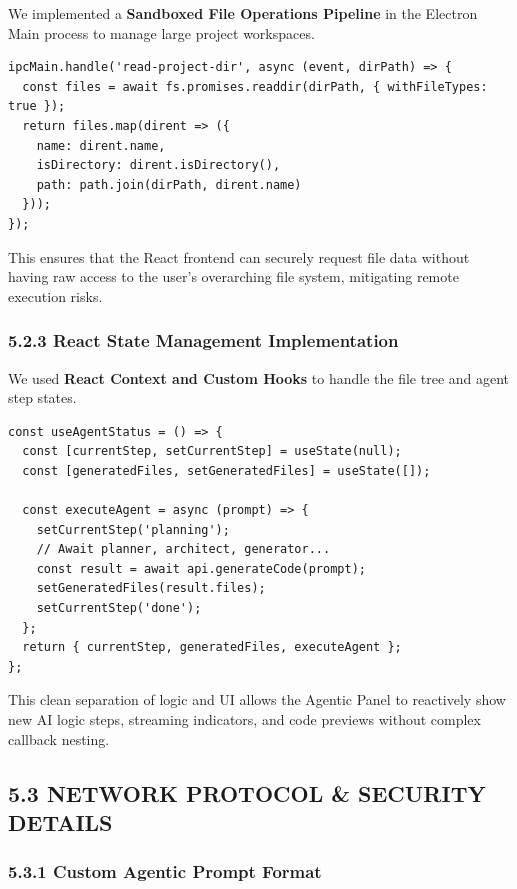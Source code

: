 \documentclass[
  12pt,
]{article}
\begin{document}
We implemented a \textbf{Sandboxed File Operations Pipeline} in the
Electron Main process to manage large project workspaces.

\begin{verbatim}
ipcMain.handle('read-project-dir', async (event, dirPath) => {
  const files = await fs.promises.readdir(dirPath, { withFileTypes: true });
  return files.map(dirent => ({
    name: dirent.name,
    isDirectory: dirent.isDirectory(),
    path: path.join(dirPath, dirent.name)
  }));
});
\end{verbatim}

This ensures that the React frontend can securely request file data
without having raw access to the user's overarching file system,
mitigating remote execution risks.

\subsubsection{5.2.3 React State Management
Implementation}\label{react-state-management-implementation}

We used \textbf{React Context and Custom Hooks} to handle the file tree
and agent step states.

\begin{verbatim}
const useAgentStatus = () => {
  const [currentStep, setCurrentStep] = useState(null);
  const [generatedFiles, setGeneratedFiles] = useState([]);
  
  const executeAgent = async (prompt) => {
    setCurrentStep('planning');
    // Await planner, architect, generator...
    const result = await api.generateCode(prompt);
    setGeneratedFiles(result.files);
    setCurrentStep('done');
  };
  return { currentStep, generatedFiles, executeAgent };
};
\end{verbatim}

This clean separation of logic and UI allows the Agentic Panel to
reactively show new AI logic steps, streaming indicators, and code
previews without complex callback nesting.

\subsection{5.3 NETWORK PROTOCOL \& SECURITY
DETAILS}\label{network-protocol-security-details}

\subsubsection{5.3.1 Custom Agentic Prompt
Format}\label{custom-agentic-prompt-format}
\end{document}
